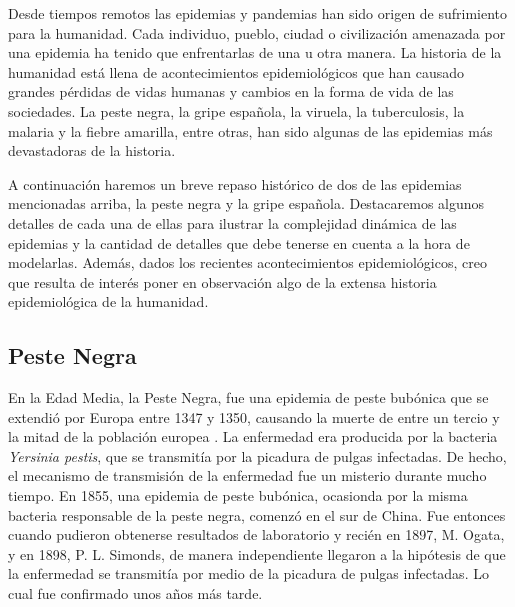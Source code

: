 \graphicspath{{figs/cap3}}


Desde tiempos remotos las epidemias y pandemias han sido origen de sufrimiento para la humanidad. Cada individuo, pueblo, ciudad o civilización amenazada por una epidemia ha tenido 
que enfrentarlas de una u otra manera. La historia de la humanidad está llena de acontecimientos epidemiológicos que han causado grandes pérdidas de vidas humanas y cambios en la 
forma de vida de las sociedades. La peste negra, la gripe española, la viruela, la tuberculosis, la malaria  y la fiebre amarilla,
entre otras, han sido algunas de las epidemias más devastadoras de la historia. 

A continuación haremos un breve repaso histórico de dos de las epidemias mencionadas arriba, la peste negra y la gripe española. Destacaremos algunos detalles de cada una de 
ellas para ilustrar la complejidad dinámica de las epidemias y la cantidad de detalles que debe tenerse en cuenta a la hora de modelarlas. Además, dados los recientes 
acontecimientos epidemiológicos, creo que resulta de interés poner en observación algo de la extensa historia epidemiológica de la humanidad.

\subsection*{Peste Negra}

En la Edad Media, la Peste Negra, fue una epidemia de peste bubónica que se extendió por Europa entre 1347 y 1350, causando la muerte de entre un tercio y la mitad de la 
población europea \cite{black_death3}. La enfermedad era producida por la bacteria \textit{Yersinia pestis}, que se transmitía por la picadura de pulgas infectadas. De hecho, el mecanismo de 
transmisión de la enfermedad fue un misterio durante mucho tiempo.
En 1855, una epidemia de peste bubónica, ocasionda por la misma bacteria responsable de la peste negra, comenzó en el sur de China. Fue entonces cuando pudieron obtenerse resultados de laboratorio y recién en 1897, M. Ogata, y en 1898,
P. L. Simonds, de manera independiente llegaron a la hipótesis de que la enfermedad se transmitía por medio de la picadura de pulgas infectadas. Lo cual fue confirmado unos 
años más tarde. 


